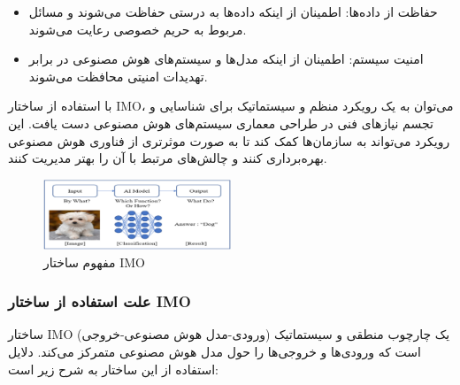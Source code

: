 \documentclass[a4paper,10pt]{article}
\begin{document}
\begin{itemize}
\begin{itemize}
\begin{itemize}
                            \item حفاظت از داده‌ها: اطمینان از اینکه داده‌ها به درستی حفاظت می‌شوند و مسائل مربوط به حریم خصوصی رعایت می‌شوند.

                            \item امنیت سیستم: اطمینان از اینکه مدل‌ها و سیستم‌های هوش مصنوعی در برابر تهدیدات امنیتی محافظت می‌شوند.

                        \end{itemize}

                    \end{itemize}

                \end{itemize}

                با استفاده از ساختار IMO، می‌توان به یک رویکرد منظم و سیستماتیک برای شناسایی و تجسم نیازهای فنی در طراحی معماری سیستم‌های هوش مصنوعی دست یافت. این رویکرد می‌تواند به سازمان‌ها کمک کند تا به صورت موثرتری از فناوری هوش مصنوعی بهره‌برداری کنند و چالش‌های مرتبط با آن را بهتر مدیریت کنند.

                \begin{figure}[htbp]

                    \centering
                    \includegraphics[width=0.5\textwidth]{image/fig 1.png}
                    \caption{مفهوم ساختار IMO}
                    \label{fig:fig_1}
            
                \end{figure}

            \subsubsection{علت استفاده از ساختار IMO}

            ساختار IMO (ورودی-مدل هوش مصنوعی-خروجی) یک چارچوب منطقی و سیستماتیک است که ورودی‌ها و خروجی‌ها را حول مدل هوش مصنوعی متمرکز می‌کند. دلایل استفاده از این ساختار به شرح زیر است:
\end{document}

